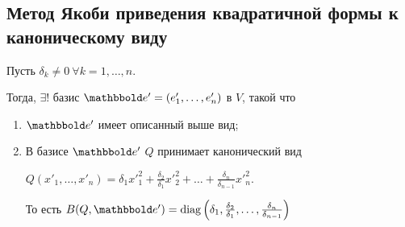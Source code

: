 \subsection{Метод Якоби приведения квадратичной формы к каноническому виду}


\begin{theorem}
    Пусть $\delta_k \neq 0 \ \forall k = 1, \dots, n$.

    Тогда, $\exists!$ базис $\E' = (e'_1, \dots, e'_n)$ в $V$, такой что
    \begin{enumerate}
    \item $\E'$ имеет описанный выше вид;
    \item В базисе $\E'$ $Q$ принимает канонический вид

        $Q(x'_1, \dots, x'_n) = \delta_1 x'^2_1 + \frac{\delta_2}{\delta_1} x'^2_2 + \dots + \frac{\delta_n}{\delta_{n - 1}} x'^2_n$.

        То есть $B(Q, \E') = \diag\left(\delta_1, \frac{\delta_2}{\delta_1}, \dots, \frac{\delta_n}{\delta_{n - 1}}\right)$
    \end{enumerate}
\end{theorem}

